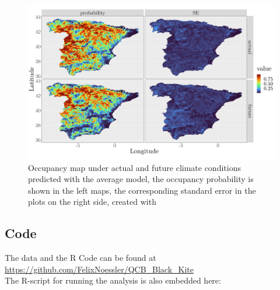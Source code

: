 \documentclass[12pt]{scrartcl} %
\begin{document}
\begin{figure}[H]
	\centering
	\includegraphics[width=\linewidth]{img/avg_model_map}
	\caption{Occupancy map under actual and future climate conditions predicted with the average model, the occupancy probability is shown in the left maps, the corresponding standard error in the plots on the right side, created with \textcite{ggplot2}}	
	\label{fig:avg_map}
\end{figure}


\subsection*{Code}
The data and the R Code can be found at \\ \url{https://github.com/FelixNoessler/QCB_Black_Kite} \\

\noindent
The R-script for running the analysis is also embedded here:






	
\end{document}
